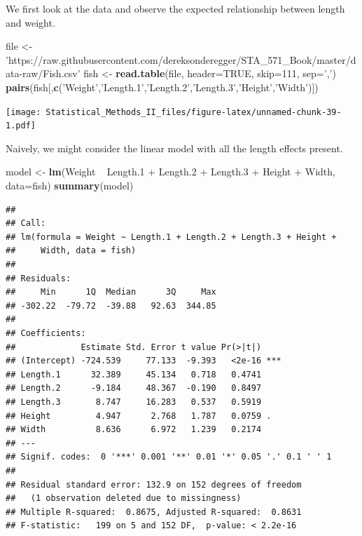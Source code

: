 \documentclass[]{book}
\newenvironment{Shaded}{\begin{snugshade}}{\end{snugshade}}
\newcommand{\KeywordTok}[1]{\textcolor[rgb]{0.13,0.29,0.53}{\textbf{{#1}}}}
\newcommand{\DataTypeTok}[1]{\textcolor[rgb]{0.13,0.29,0.53}{{#1}}}
\newcommand{\DecValTok}[1]{\textcolor[rgb]{0.00,0.00,0.81}{{#1}}}
\newcommand{\FloatTok}[1]{\textcolor[rgb]{0.00,0.00,0.81}{{#1}}}
\newcommand{\StringTok}[1]{\textcolor[rgb]{0.31,0.60,0.02}{{#1}}}
\newcommand{\OtherTok}[1]{\textcolor[rgb]{0.56,0.35,0.01}{{#1}}}
\newcommand{\NormalTok}[1]{{#1}}
\theoremstyle{definition}
\theoremstyle{definition}
\theoremstyle{remark}
\begin{document}
We first look at the data and observe the expected relationship between
length and weight.

\begin{Shaded}
\begin{Highlighting}[]
\NormalTok{file <-}\StringTok{ 'https://raw.githubusercontent.com/dereksonderegger/STA_571_Book/master/data-raw/Fish.csv'}
\NormalTok{fish <-}\StringTok{ }\KeywordTok{read.table}\NormalTok{(file, }\DataTypeTok{header=}\OtherTok{TRUE}\NormalTok{, }\DataTypeTok{skip=}\DecValTok{111}\NormalTok{, }\DataTypeTok{sep=}\StringTok{','}\NormalTok{)}
\KeywordTok{pairs}\NormalTok{(fish[,}\KeywordTok{c}\NormalTok{(}\StringTok{'Weight'}\NormalTok{,}\StringTok{'Length.1'}\NormalTok{,}\StringTok{'Length.2'}\NormalTok{,}\StringTok{'Length.3'}\NormalTok{,}\StringTok{'Height'}\NormalTok{,}\StringTok{'Width'}\NormalTok{)])}
\end{Highlighting}
\end{Shaded}

\texttt{[image: Statistical\_Methods\_II\_files/figure-latex/unnamed-chunk-39-1.pdf]}

Naively, we might consider the linear model with all the length effects
present.

\begin{Shaded}
\begin{Highlighting}[]
\NormalTok{model <-}\StringTok{ }\KeywordTok{lm}\NormalTok{(Weight ~}\StringTok{ }\NormalTok{Length}\FloatTok{.1} \NormalTok{+}\StringTok{ }\NormalTok{Length}\FloatTok{.2} \NormalTok{+}\StringTok{ }\NormalTok{Length}\FloatTok{.3} \NormalTok{+}\StringTok{ }\NormalTok{Height +}\StringTok{ }\NormalTok{Width, }\DataTypeTok{data=}\NormalTok{fish)}
\KeywordTok{summary}\NormalTok{(model)}
\end{Highlighting}
\end{Shaded}

\begin{verbatim}
## 
## Call:
## lm(formula = Weight ~ Length.1 + Length.2 + Length.3 + Height + 
##     Width, data = fish)
## 
## Residuals:
##     Min      1Q  Median      3Q     Max 
## -302.22  -79.72  -39.88   92.63  344.85 
## 
## Coefficients:
##             Estimate Std. Error t value Pr(>|t|)    
## (Intercept) -724.539     77.133  -9.393   <2e-16 ***
## Length.1      32.389     45.134   0.718   0.4741    
## Length.2      -9.184     48.367  -0.190   0.8497    
## Length.3       8.747     16.283   0.537   0.5919    
## Height         4.947      2.768   1.787   0.0759 .  
## Width          8.636      6.972   1.239   0.2174    
## ---
## Signif. codes:  0 '***' 0.001 '**' 0.01 '*' 0.05 '.' 0.1 ' ' 1
## 
## Residual standard error: 132.9 on 152 degrees of freedom
##   (1 observation deleted due to missingness)
## Multiple R-squared:  0.8675, Adjusted R-squared:  0.8631 
## F-statistic:   199 on 5 and 152 DF,  p-value: < 2.2e-16
\end{verbatim}
\end{document}

